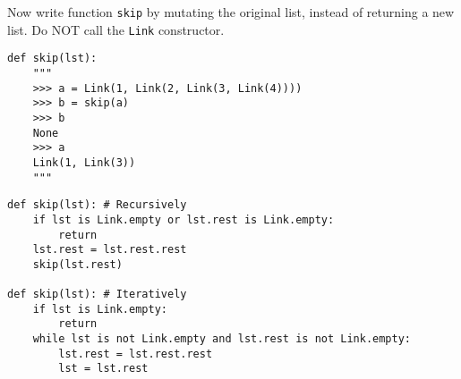 \begin{blocksection}
\question Now write function \texttt{skip} by mutating the original list, instead of returning a new list. Do NOT call the \texttt{Link} constructor.

\begin{lstlisting}
def skip(lst):
    """
    >>> a = Link(1, Link(2, Link(3, Link(4))))
    >>> b = skip(a)
    >>> b
    None
    >>> a
    Link(1, Link(3))
    """
\end{lstlisting}

\begin{solution}[1in]
\begin{lstlisting}
def skip(lst): # Recursively
    if lst is Link.empty or lst.rest is Link.empty:
        return
    lst.rest = lst.rest.rest
    skip(lst.rest)

def skip(lst): # Iteratively
    if lst is Link.empty:
        return
    while lst is not Link.empty and lst.rest is not Link.empty:
        lst.rest = lst.rest.rest
        lst = lst.rest
\end{lstlisting}
\end{solution}

\end{blocksection}
